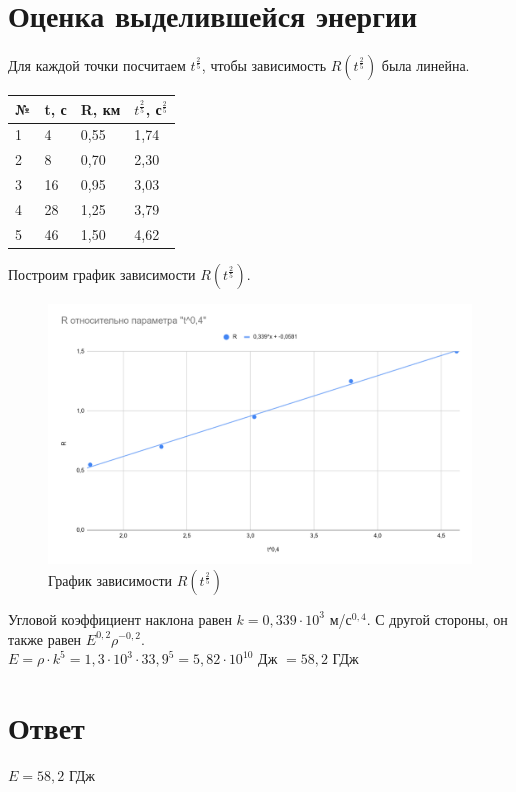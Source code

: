 \documentclass[12pt]{article}
\begin{document}
	\section{Оценка выделившейся энергии}
	Для каждой точки посчитаем $t^\frac{2}{5}$, чтобы зависимость $R(t^\frac{2}{5})$ была линейна.
	\begin{table}[H]
		\begin{tabular}{|l|l|l|l|}
			\hline
			№ & t, с & R, км & $t^\frac{2}{5}$, с$^\frac{2}{5}$ \\ \hline
			1 & 4    & 0,55  & 1,74                             \\ \hline
			2 & 8    & 0,70  & 2,30                             \\ \hline
			3 & 16   & 0,95  & 3,03                             \\ \hline
			4 & 28   & 1,25  & 3,79                             \\ \hline
			5 & 46   & 1,50  & 4,62                             \\ \hline
		\end{tabular}
	\end{table}
	Построим график зависимости $R(t^\frac{2}{5})$.
	\begin{figure}[H]
		\centering
		\includegraphics[width=\linewidth]{graph}
		\caption{График зависимости $R(t^\frac{2}{5})$}
	\end{figure}
	Угловой коэффициент наклона равен $k = 0,339\cdot10^3$ м/с$^{0,4}$. С другой стороны, он также равен $E^{0,2}\rho^{-0,2}$.\\
	$E = \rho\cdot k^5 = 1,3\cdot10^3\cdot33,9^5=5,82\cdot10^{10}$ Дж $=58,2$ ГДж
	\section{Ответ}
	$E=58,2$ ГДж
\end{document}
